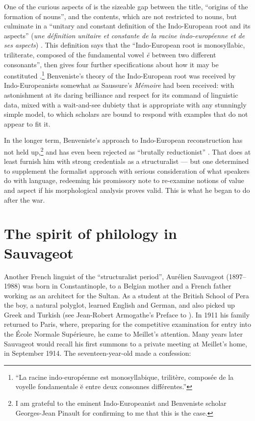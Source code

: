\documentclass[output=paper]{langscibook}
\begin{document}
One of the curious aspects of \citet{Benveniste1935} is the sizeable gap between the title, ``origins of the formation of nouns'', and the contents, which are not restricted to nouns, but culminate in a ``unitary and constant definition of the Indo-European root and its aspects'' (\emph{une définition unitaire et constante de la racine indo-européenne et de ses aspects}) \citep[170]{Benveniste1935}. This definition says that the ``Indo-European root is monosyllabic, triliterate, composed of the fundamental vowel \emph{ĕ} between two different consonants'', then gives four further specifications about how it may be constituted \citep[170--171]{Benveniste1935}.\footnote{``La racine indo-européenne est monosyllabique, trilitère, composée de la voyelle fondamentale ĕ entre deux consonnes différentes.''} Benveniste's theory of the Indo-European root was received by Indo-Europeanists somewhat as Saussure's \emph{Mémoire} had been received: with astonishment at its daring brilliance and respect for its command of linguistic data, mixed with a wait-and-see dubiety that is appropriate with any stunningly simple model, to which scholars are bound to respond with examples that do not appear to fit it.

In the longer term, Benveniste's approach to Indo-European reconstruction has not held up,\footnote{I am grateful to the eminent Indo-Europeanist and Benveniste scholar Georges-Jean Pinault for confirming to me that this is the case.} and has even been rejected as ``brutally reductionist'' \citep[560]{Dunkel1981}. That does at least furnish him with strong credentials as a structuralist — but one determined to supplement the formalist approach with serious consideration of what speakers do with language, redeeming his \citeyear{Benveniste1935} promissory note to re-examine notions of value and aspect if his morphological analysis proves valid. This is what he began to do after the war.

\section{The spirit of philology in Sauvageot}
\label{sec:joseph:sauvageot}

Another French linguist of the ``structuralist period'', Aurélien Sauvageot (1897--1988) was born in Constantinople, to a Belgian mother and a French father working as an architect for the Sultan. As a student at the British School of Pera the boy, a natural polyglot, learned English and German, and also picked up Greek and Turkish (see Jean-Robert Armogathe’s Preface to \citet[9]{Sauvageot2013}). In 1911 his family returned to Paris, where, preparing for the competitive examination for entry into the École Normale Supérieure, he came to Meillet's attention. Many years later Sauvageot would recall his first summons to a private meeting at Meillet's home, in September 1914. The seventeen-year-old made a confession:
\end{document}
